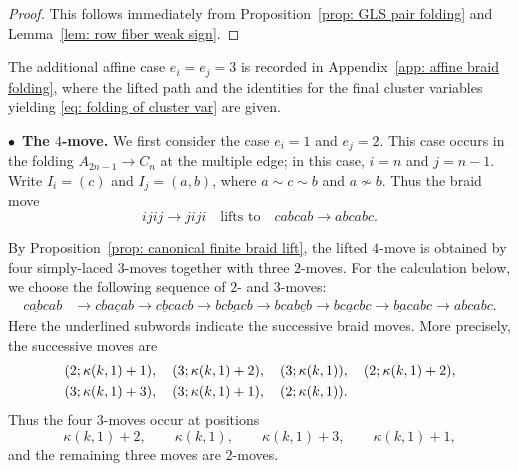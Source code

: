 \documentclass[12pt, leqno]{amsart}
\numberwithin{equation}{section}
\theoremstyle{plain}
\theoremstyle{definition}
\begin{document}
\begin{proof}
This follows immediately from
Proposition~\ref{prop: GLS pair folding} and
Lemma~\ref{lem: row fiber weak sign}.
\end{proof}

The additional affine case $e_i=e_j=3$ is recorded in
Appendix~\ref{app: affine braid folding}, where the lifted path and
the identities for the final cluster variables yielding \eqref{eq: folding of cluster var}
are given.

\medskip
\noindent
$\bullet$\ \textbf{The $4$-move.}
We first consider the case $e_i=1$ and $e_j=2$.
 This case occurs in the folding $A_{2n-1}\longrightarrow C_n$ at the multiple edge; in this case,
$i=n$ and $j=n-1$. Write
$I_i=(c)$ and $I_j=(a,b)$,
where $a\sim c\sim b$ and $a\nsim b$.
Thus the braid move
\[
ijij\longrightarrow jiji \quad\text{lifts to}\quad   cabcab\longrightarrow abcabc.
\]

By Proposition~\ref{prop: canonical finite braid lift}, the lifted
$4$-move is obtained by four simply-laced $3$-moves together with
three $2$-moves.  For the calculation below, we choose the following
 sequence of $2$- and $3$-moves:{}
\begin{equation}\label{eq: seq of lifted 4-move 1,2}
\begin{aligned}
c\underline{ab}cab &\longrightarrow cb\underline{aca}b \longrightarrow \underline{cbc}acb \longrightarrow bc\underline{ba}cb
\longrightarrow bca\underline{bcb} \longrightarrow b\underline{cac}bc  \longrightarrow \underline{ba}cabc \longrightarrow abcabc.
\end{aligned}
\end{equation}
Here the underlined subwords indicate the successive braid moves.
More precisely, the successive moves are
\begin{align*}
 &(2;\kappa(k,1)+1),\quad (3;\kappa(k,1)+2),\quad
 (3;\kappa(k,1)),\quad (2;\kappa(k,1)+2),\allowdisplaybreaks\\
 &(3;\kappa(k,1)+3),\quad (3;\kappa(k,1)+1),\quad
 (2;\kappa(k,1)).
\end{align*}
Thus the four $3$-moves occur at positions
\[
  \kappa(k,1)+2,\qquad \kappa(k,1),\qquad \kappa(k,1)+3,\qquad \kappa(k,1)+1,
\]
and the remaining three moves are $2$-moves.
\end{document}
